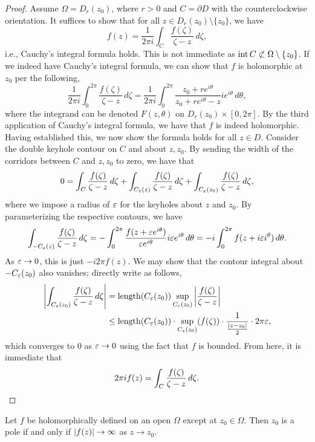 \begin{proof}
    Assume $\Omega = D_r(z_0)$, where $r > 0$ and $C = \partial D$ with the counterclockwise orientation. It suffices to show that for all $z \in D_r(z_0) \setminus \{z_0\}$, we have
    \[ f(z) = \frac{1}{2\pi i} \int_C \frac{f(\zeta)}{\zeta - z} \, d\zeta, \]
    i.e., Cauchy's integral formula holds. This is not immediate as $\operatorname{int} C \not\subset \Omega \setminus \{z_0\}$. If we indeed have Cauchy's integral formula, we can show that $f$ is holomorphic at $z_0$ per the following,
    \[ \frac{1}{2\pi i} \int_0^{2\pi} \frac{f(\zeta)}{\zeta - z} \, d\zeta = \frac{1}{2\pi i} \int_0^{2\pi} \frac{z_0 + re^{i\theta}}{z_0 + re^{i\theta} - z} i e^{i \theta} \, d\theta, \]
    where the integrand can be denoted $F(z, \theta)$ on $D_r(z_0) \times [0, 2\pi]$. By the third application of Cauchy's integral formula, we have that $f$ is indeed holomorphic. Having established this, we now show the formula holds for all $z \in D$. Consider the double keyhole contour on $C$ and about $z, z_0$. By sending the width of the corridors between $C$ and $z, z_0$ to zero, we have that
    \[ 0 = \int_C \frac{f(\zeta)}{\zeta - z} \, d\zeta + \int_{C_\varepsilon(z)} \frac{f(\zeta)}{\zeta - z} \, d\zeta + \int_{C_\varepsilon(z_0)} \frac{f(\zeta)}{\zeta - z} \, d\zeta, \]
    where we impose a radius of $\varepsilon$ for the keyholes about $z$ and $z_0$. By parameterizing the respective contours, we have
    \[ \int_{-C_\varepsilon(z)} \frac{f(\zeta)}{\zeta - z} \, d\zeta = - \int_0^{2\pi} \frac{f(z + \varepsilon e^{i\theta})}{\varepsilon e^{i \theta}} i \varepsilon e^{i \theta} \, d\theta = -i \int_0^{2\pi} f(z + i \varepsilon i^\theta) \, d\theta. \]
    As $\varepsilon \to 0$, this is just $-i 2\pi f(z)$. We may show that the contour integral about $-C_\varepsilon(z_0)$ also vanishes; directly write as follows,
    \begin{align*}
        \left\lvert \int_{C_\varepsilon(z_0)} \frac{f(\zeta)}{\zeta - z} \, d\zeta \right\rvert &= \operatorname{length}(C_\varepsilon(z_0)) \sup_{C_\varepsilon(z_0)} \left\lvert \frac{f(\zeta)}{\zeta - z} \right\rvert \\
        &\leq \operatorname{length}(C_\varepsilon(z_0)) \cdot \sup_{C_\varepsilon(z_0)} (f(\zeta)) \cdot \frac{1}{\frac{\left\lvert z - z_0 \right\rvert}{2}} \cdot 2 \pi \varepsilon,
    \end{align*}
    which converges to $0$ as $\varepsilon \to 0$ using the fact that $f$ is bounded. From here, it is immediate that
    \[ 2 \pi i f(z) = \int_C \frac{f(\zeta)}{\zeta - z} \, d\zeta. \qedhere \]
\end{proof}
\begin{corollary}
    Let $f$ be holomorphically defined on an open $\Omega$ except at $z_0 \in \Omega$. Then $z_0$ is a pole if and only if $\left\lvert f(z) \right\rvert \to \infty$ as $z \to z_0$.
\end{corollary}
